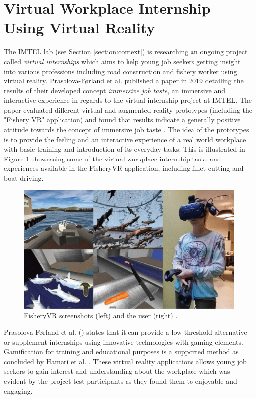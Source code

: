 \section{Virtual Workplace Internship Using Virtual Reality}
\label{section:VRworkplaceIntership}
The IMTEL lab (see Section \ref{section:context}) is researching an ongoing project called \textit{virtual internships} which aims to help young job seekers getting insight into various professions including road construction and fishery worker using virtual reality. Prasolova-Førland et al. \cite{prasolova2019empowering} published a paper in 2019 detailing the results of their developed concept \textit{immersive job taste}, an immersive and interactive experience in regards to the virtual internship project at IMTEL. The paper evaluated different virtual and augmented reality prototypes (including the "Fishery VR" application) and found that results indicate a generally positive attitude towards the concept of immersive job taste \cite{prasolova2019empowering}. The idea of the prototypes is to provide the feeling and an interactive experience of a real world workplace with basic training and introduction of its everyday tasks. This is illustrated in Figure \ref{fig:FisheryVR} showcasing some of the virtual workplace internship tasks and experiences available in the FisheryVR application, including fillet cutting and boat driving. 

 \begin{figure}[!ht]
     \centering
     \includegraphics[width=.7\textwidth]{./fig/related_work/fisheryVR.png}
     \caption{FisheryVR screenshots (left) and the user (right) \cite{prasolova2019empowering}.}
     \label{fig:FisheryVR}
 \end{figure}

Prasolova-Førland et al. (\citeyear{prasolova2019empowering}) states that it can provide a low-threshold alternative or supplement internships using innovative technologies with gaming elements. Gamification for training and educational purposes is a supported method as concluded by Hamari et al. \cite{hamari2014does}. These virtual reality applications allows young job seekers to gain interest and understanding about the workplace which was evident by the project test participants as they found them to enjoyable and engaging. 

